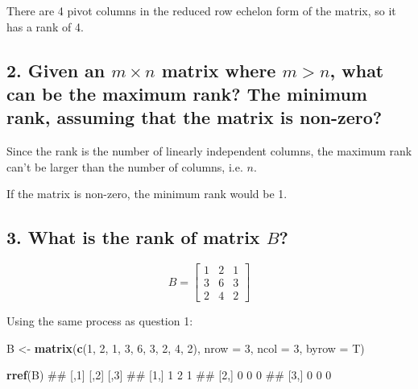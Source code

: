 \documentclass[]{article}
\newenvironment{Shaded}{\begin{snugshade}}{\end{snugshade}}
\newcommand{\KeywordTok}[1]{\textcolor[rgb]{0.13,0.29,0.53}{\textbf{#1}}}
\newcommand{\DataTypeTok}[1]{\textcolor[rgb]{0.13,0.29,0.53}{#1}}
\newcommand{\DecValTok}[1]{\textcolor[rgb]{0.00,0.00,0.81}{#1}}
\newcommand{\StringTok}[1]{\textcolor[rgb]{0.31,0.60,0.02}{#1}}
\newcommand{\NormalTok}[1]{#1}
\begin{document}
There are 4 pivot columns in the reduced row echelon form of the matrix,
so it has a rank of 4.

\subsection{\texorpdfstring{2. Given an \(m\times n\) matrix where
\(m>n\), what can be the maximum rank? The minimum rank, assuming that
the matrix is
non-zero?}{2. Given an m\textbackslash{}times n matrix where m\textgreater{}n, what can be the maximum rank? The minimum rank, assuming that the matrix is non-zero?}}\label{given-an-mtimes-n-matrix-where-mn-what-can-be-the-maximum-rank-the-minimum-rank-assuming-that-the-matrix-is-non-zero}

Since the rank is the number of linearly independent columns, the
maximum rank can't be larger than the number of columns, i.e. \(n\).

If the matrix is non-zero, the minimum rank would be 1.

\subsection{\texorpdfstring{3. What is the rank of matrix
\(B\)?}{3. What is the rank of matrix B?}}\label{what-is-the-rank-of-matrix-b}

\[B = \begin{bmatrix} 1 & 2 & 1\\
                     3 & 6 & 3\\
                     2 & 4 & 2
     \end{bmatrix}\]

Using the same process as question 1:

\begin{Shaded}
\begin{Highlighting}[]
\NormalTok{B <-}\StringTok{ }\KeywordTok{matrix}\NormalTok{(}\KeywordTok{c}\NormalTok{(}\DecValTok{1}\NormalTok{, }\DecValTok{2}\NormalTok{, }\DecValTok{1}\NormalTok{,}
              \DecValTok{3}\NormalTok{, }\DecValTok{6}\NormalTok{, }\DecValTok{3}\NormalTok{,}
              \DecValTok{2}\NormalTok{, }\DecValTok{4}\NormalTok{, }\DecValTok{2}\NormalTok{),}
            \DataTypeTok{nrow =} \DecValTok{3}\NormalTok{, }\DataTypeTok{ncol =} \DecValTok{3}\NormalTok{, }\DataTypeTok{byrow =}\NormalTok{ T)}

\KeywordTok{rref}\NormalTok{(B)}
\NormalTok{##      [,1] [,2] [,3]}
\NormalTok{## [1,]    1    2    1}
\NormalTok{## [2,]    0    0    0}
\NormalTok{## [3,]    0    0    0}
\end{Highlighting}
\end{Shaded}
\end{document}
